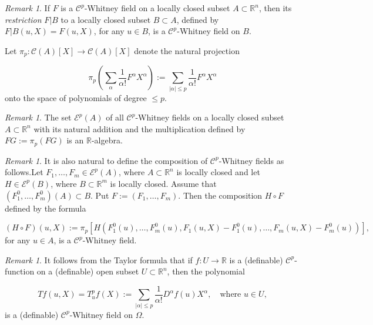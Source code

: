 \documentclass[12pt]{amsart}
\theoremstyle{definition}
\theoremstyle{remark}
\newtheorem{rem}[thm]{Remark}
\numberwithin{equation}{section}
\newcommand{\Real}{\mathbb R}
\begin{document}
\bigskip
\begin{rem} If $F$ is a $\mathcal{C}^p$-Whitney field on a locally closed subset $A\subset \Real^n$, then its \emph{restriction} $F|B$ to a locally closed subset $B\subset A$, defined by
$F|B(u, X) = F(u, X)$, for any $u\in B$, is a $\mathcal{C}^p$-Whitney field on $B$.
\end{rem}

\medskip
Let $\pi_p: \mathcal{C}(A)[X]\longrightarrow \mathcal{C}(A)[X]$ denote the natural projection

$$
\pi_p(\sum_{\alpha} \frac{1}{\alpha!}F^{\alpha}X^{\alpha}):= \sum_{|\alpha|\leq p} \frac{1}{\alpha!}F^{\alpha}X^{\alpha}
$$
onto the space of polynomials of degree $\leq p$.

\medskip
\begin{rem} The set $\mathcal{E}^p(A)$ of all $\mathcal{C}^p$-Whitney fields on a locally closed subset $A\subset \mathbb{R}^n$ with its natural addition and the multiplication defined by $FG := \pi_p(FG)$ is an $\Real$-algebra.
\end{rem}

\bigskip
\begin{rem}It is also natural to define the composition of $\mathcal{C}^p$-Whitney fields as follows.\newline Let $F_1,\dots,F_m\in \mathcal{E}^p(A)$, where $A\subset \mathbb{R}^n$ is locally closed and let $H\in \mathcal{E}^p(B)$, where $B\subset \mathbb{R}^m$ is locally closed. Assume that $(F_1^0,\dots,F_m^0)(A)\subset B$. Put $F:=(F_1,\dots,F_m)$. Then the composition $H\circ F$ defined by the formula

$$
(H\circ F)(u, X) := \pi_p[ H(F_1^0(u),\dots, F_m^0(u), F_1(u, X)-F_1^0(u),\dots,F_m(u, X)-F_m^0(u))],
$$
for any $u\in A$, is a $\mathcal{C}^p$-Whitney field.
\end{rem}

\medskip
\begin{rem} It follows from the Taylor formula that if $f: U\longrightarrow \Real$ is a (definable) $\mathcal{C}^p$-function on a (definable) open subset $U \subset \Real^n$, then the polynomial

$$
Tf(u, X)= T_u^pf(X):= \sum_{|\alpha|\leq p}\frac{1}{\alpha!}D^{\alpha}f(u)X^{\alpha},\quad\text{where $u\in U$},
$$
is a (definable) $\mathcal{C}^p$-Whitney field on $\varOmega$.
\end{rem}
\end{document}
